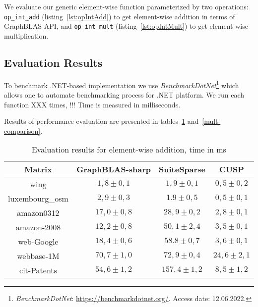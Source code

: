 We evaluate our generic element-wise function parameterized by two operations: \texttt{op\_int\_add} (listing~\ref{lst:opIntAdd}) to get element-wise addition in terms of GraphBLAS API, and \texttt{op\_int\_mult} (listing~\ref{lst:opIntMult}) to get element-wise multiplication.


\subsection{Evaluation Results}

To benchmark .NET-based implementation we use \textit{BenchmarkDotNet}\footnote{\textit{BenchmarkDotNet}: \url{https://benchmarkdotnet.org/}. Access date: 12.06.2022.} which allows one to automate benchmarking process for .NET platform.
We run each function XXX times, !!!
Time is measured in milliseconds.

Results of performance evaluation are presented in tables~\ref{add-comparison} and~\ref{mult-comparison}.


\begin{table}[h]
    \centering    
    \caption{Evaluation results for element-wise addition, time in ms}    
    \label{add-comparison}
    \begin{tabular}{|c||c|c|c|}
    \hline
    Matrix            & GraphBLAS-sharp & SuiteSparse & CUSP        \\
    \hline
    \hline
    wing            & $1,8 \pm 0,1$      & $1,9\pm 0,1$   & $0,5\pm 0,2$   \\
    \hline
    luxembourg\_osm & $2,9 \pm 0,3$      & $1.9\pm 0,5$   & $0,5\pm 0,1$   \\
    \hline
    amazon0312      & $17,0 \pm 0,8$      & $28,9\pm 0,2$  & $2,8\pm 0,1$   \\
    \hline
    amazon-2008     & $12,2 \pm 0,8$     & $50,1\pm 2,4$  & $3,5\pm 0,1$   \\
    \hline
    web-Google      & $18,4 \pm 0,6$     & $58.8\pm 0,7$  & $3,6\pm 0,1$   \\
    \hline
    webbase-1M      & $70,7 \pm 1,0$      & $72,9\pm 0,4$  & $24,6\pm 2,1$  \\
    \hline
    cit-Patents     & $54,6 \pm 1,2$      & $157,4\pm 1,2$ & $8,5\pm 1,2$   \\     
    \hline
    \end{tabular}    
\end{table}

